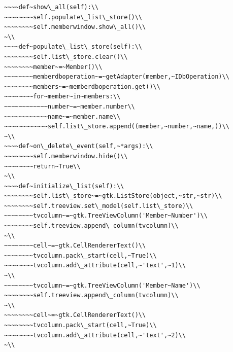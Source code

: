 \documentclass[a4paper,openany,twoside,draft]{book}
\begin{document}
\begin{verbatim}
~~~~def~show\_all(self):\\
~~~~~~~~self.populate\_list\_store()\\
~~~~~~~~self.memberwindow.show\_all()\\
~\\
~~~~def~populate\_list\_store(self):\\
~~~~~~~~self.list\_store.clear()\\
~~~~~~~~member~=~Member()\\
~~~~~~~~memberdboperation~=~getAdapter(member,~IDbOperation)\\
~~~~~~~~members~=~memberdboperation.get()\\
~~~~~~~~for~member~in~members:\\
~~~~~~~~~~~~number~=~member.number\\
~~~~~~~~~~~~name~=~member.name\\
~~~~~~~~~~~~self.list\_store.append((member,~number,~name,))\\
~\\
~~~~def~on\_delete\_event(self,~*args):\\
~~~~~~~~self.memberwindow.hide()\\
~~~~~~~~return~True\\
~\\
~~~~def~initialize\_list(self):\\
~~~~~~~~self.list\_store~=~gtk.ListStore(object,~str,~str)\\
~~~~~~~~self.treeview.set\_model(self.list\_store)\\
~~~~~~~~tvcolumn~=~gtk.TreeViewColumn('Member~Number')\\
~~~~~~~~self.treeview.append\_column(tvcolumn)\\
~\\
~~~~~~~~cell~=~gtk.CellRendererText()\\
~~~~~~~~tvcolumn.pack\_start(cell,~True)\\
~~~~~~~~tvcolumn.add\_attribute(cell,~'text',~1)\\
~\\
~~~~~~~~tvcolumn~=~gtk.TreeViewColumn('Member~Name')\\
~~~~~~~~self.treeview.append\_column(tvcolumn)\\
~\\
~~~~~~~~cell~=~gtk.CellRendererText()\\
~~~~~~~~tvcolumn.pack\_start(cell,~True)\\
~~~~~~~~tvcolumn.add\_attribute(cell,~'text',~2)\\
~\\

\end{verbatim}
\end{document}
